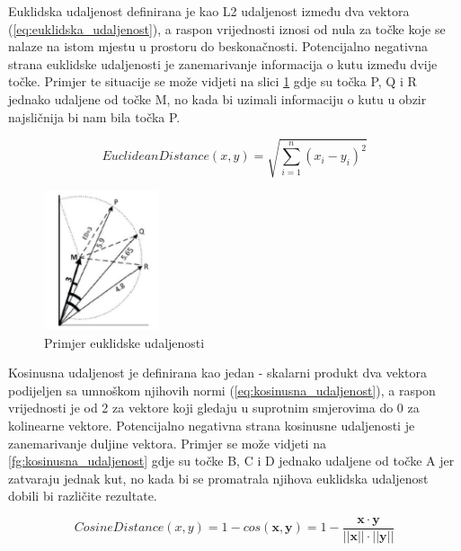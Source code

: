 \documentclass[times, utf8, proizvoljni, numeric]{fer}
\begin{document}
Euklidska udaljenost definirana je kao L2 udaljenost između dva vektora (\ref{eq:euklidska_udaljenost}), a raspon vrijednosti iznosi od nula za točke koje se nalaze na istom mjestu u prostoru do beskonačnosti. Potencijalno negativna strana euklidske udaljenosti je zanemarivanje informacija o kutu između dvije točke. Primjer te situacije se može vidjeti na slici \ref{fg:euklidska_udaljenost} gdje su točka P, Q i R jednako udaljene od točke M, no kada bi uzimali informaciju o kutu u obzir najsličnija bi nam bila točka P.

\begin{equation}
\label{eq:euklidska_udaljenost}
EuclideanDistance(x,y) = \sqrt{\sum_{i=1}^n (x_i-y_i)^2}    
\end{equation}

\begin{figure}[!ht]
	\begin{center}
		\captionsetup{justification=centering}
		\includegraphics[width=0.3\textwidth]{./imgs/euklidska_udaljenost.png}
		\caption{Primjer euklidske udaljenosti \cite{VectorSimilarity}}
		\label{fg:euklidska_udaljenost}
	\end{center}
\end{figure}

Kosinusna udaljenost je definirana kao jedan - skalarni produkt dva vektora podijeljen sa umnoškom njihovih normi (\ref{eq:kosinusna_udaljenost}), a raspon vrijednosti je od 2 za vektore koji gledaju u suprotnim smjerovima do 0 za kolinearne vektore. Potencijalno negativna strana kosinusne udaljenosti je zanemarivanje duljine vektora. Primjer se može vidjeti na \ref{fg:kosinusna_udaljenost} gdje su točke B, C i D jednako udaljene od točke A jer zatvaraju jednak kut, no kada bi se promatrala njihova euklidska udaljenost dobili bi različite rezultate.

\begin{equation}
\label{eq:kosinusna_udaljenost}
CosineDistance(x,y) = 1- cos(\pmb x, \pmb y) = 1 - \frac {\pmb x \cdot \pmb y}{||\pmb x|| \cdot ||\pmb y||}
\end{equation}
\end{document}
